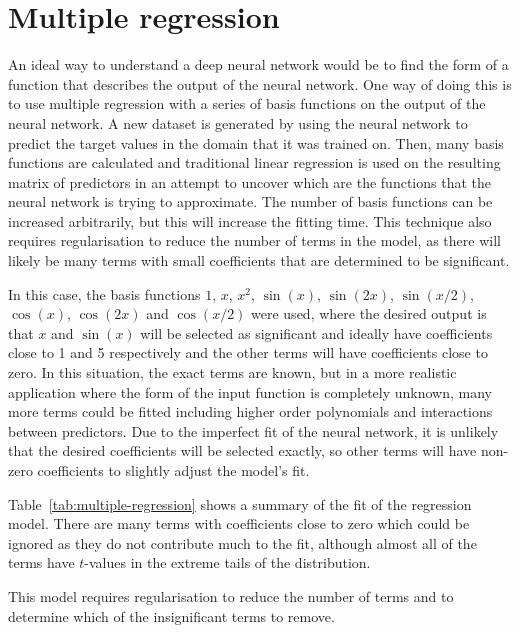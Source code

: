 \section{Multiple regression}

An ideal way to understand a deep neural network would be to find the form of a function that describes the output of the neural network.
One way of doing this is to use multiple regression with a series of basis functions on the output of the neural network.
A new dataset is generated by using the neural network to predict the target values in the domain that it was trained on.
Then, many basis functions are calculated and traditional linear regression is used on the resulting matrix of predictors in an attempt to uncover which are the  functions that the neural network is trying to approximate.
The number of basis functions can be increased arbitrarily, but this will increase the fitting time.
This technique also requires regularisation to reduce the number of terms in the model, as there will likely be many terms with small coefficients that are determined to be significant.

In this case, the basis functions \(1\), \(x\), \(x^2\), \(\sin(x)\), \(\sin(2x)\), \(\sin(x/2)\), \(\cos(x)\), \(\cos(2x)\) and \(\cos(x/2)\) were used, where the desired output is that \(x\) and \(\sin(x)\) will be selected as significant and ideally have coefficients close to 1 and 5 respectively and the other terms will have coefficients close to zero.
In this situation, the exact  terms are known, but in a more realistic application where the form of the input function is completely unknown, many more terms could be fitted including higher order polynomials and interactions between predictors.
Due to the imperfect fit of the neural network, it is unlikely that the desired coefficients will be selected exactly, so other terms will have non-zero coefficients to slightly adjust the model's fit.

Table~\ref{tab:multiple-regression} shows a summary of the fit of the regression model.
There are many terms with coefficients close to zero which could be ignored as they do not contribute much to the fit, although almost all of the terms have \(t\)-values in the extreme tails of the distribution.


This model requires regularisation to reduce the number of terms and to determine which of the insignificant terms to remove.

